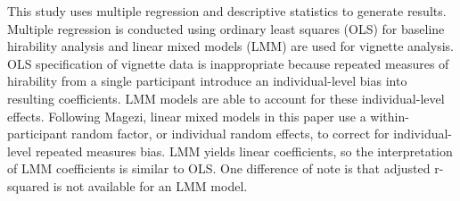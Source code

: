\documentclass[review]{elsarticle}
\begin{document}
This study uses multiple regression and descriptive statistics to generate results.
Multiple regression is conducted using ordinary least squares (OLS)
for baseline hirability analysis
and linear mixed models (LMM)
are used for vignette analysis.
OLS specification of vignette data is inappropriate because repeated measures of hirability
from a single participant introduce an individual-level bias into resulting coefficients.
LMM models are able to account for these individual-level effects.
Following Magezi\cite{magezi2015linear},
linear mixed models in this paper use a within-participant random factor,
or individual random effects,
to correct for individual-level repeated measures bias.
LMM yields linear coefficients, so the interpretation of LMM coefficients is similar to OLS.
One difference of note is that adjusted r-squared is not available for an LMM model.

\end{document}
